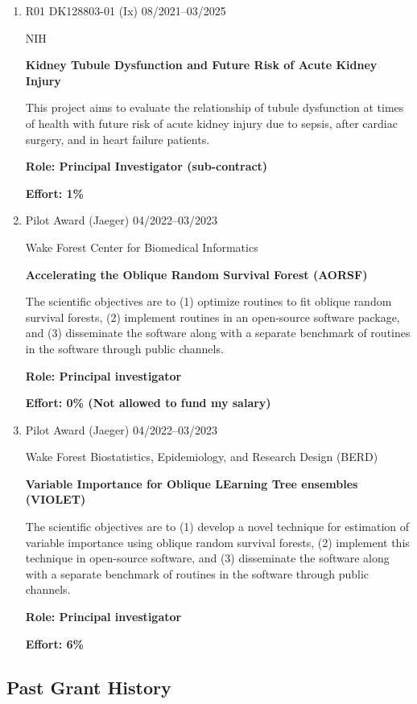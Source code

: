 \documentclass[11pt]{cv_wakeforest_article}
\newcommand{\AR}[1]{#1}  %
\newcommand{\mysubsection}[1]{\subsection*{#1}}
\begin{document}
\begin{enumerate}
{\bfseries Effort: 8\%}

\item \AR{R01 DK128803-01 (Ix)} \hfill 08/2021--03/2025

NIH

{\bfseries Kidney Tubule Dysfunction and Future Risk of Acute Kidney Injury}

This project aims to evaluate the relationship of tubule dysfunction at times of health with future risk of acute kidney injury due to sepsis, after cardiac surgery, and in heart failure patients.

{\bfseries Role: Principal Investigator (sub-contract)}

{\bfseries Effort: 1\%}

\item \AR{Pilot Award (Jaeger)} \hfill 04/2022--03/2023
  
Wake Forest Center for Biomedical Informatics
  
{\bfseries Accelerating the Oblique Random Survival Forest (AORSF)}

The scientific objectives are to (1) optimize routines to fit oblique random survival forests, (2) implement routines in an open-source software package, and (3) disseminate the software along with a separate benchmark of routines in the software through public channels.

{\bfseries Role: Principal investigator}

{\bfseries Effort: 0\% (Not allowed to fund my salary)}

\item \AR{Pilot Award (Jaeger)} \hfill 04/2022--03/2023
  
Wake Forest Biostatistics, Epidemiology, and Research Design (BERD)
  
{\bfseries Variable Importance for Oblique LEarning Tree ensembles (VIOLET)}

The scientific objectives are to (1) develop a novel technique for estimation of variable importance using oblique random survival forests, (2) implement this technique in open-source software, and (3) disseminate the software along with a separate benchmark of routines in the software through public channels.

{\bfseries Role: Principal investigator}

{\bfseries Effort: 6\%}

\end{enumerate}

\mysubsection{Past Grant History}
\end{document}
